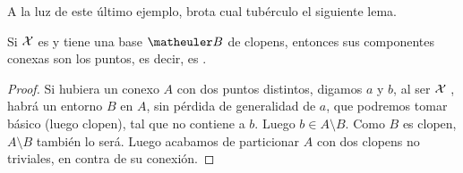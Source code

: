 A la luz de este último ejemplo, brota cual tubérculo el siguiente lema.
\begin{lem}
	\label{conex_baseClop}
	Si $\mathcal{X}$ es \kolmogorov y tiene una base $\B$ de clopens, entonces sus componentes conexas son los puntos, es decir, es .
\end{lem}
\begin{proof}
	Si hubiera un conexo $A$ con dos puntos distintos, digamos $a$ y $b$, al ser $\mathcal{X}$ \kolmogorov, habrá un entorno $B$ en $A$, sin pérdida de generalidad de $a$, que podremos tomar básico (luego clopen), tal que no contiene a $b$. Luego $b\in A\setminus B$. Como $B$ es clopen, $A\setminus B$ también lo será. Luego acabamos de particionar $A$ con dos clopens no triviales, en contra de su conexión.
\end{proof}
